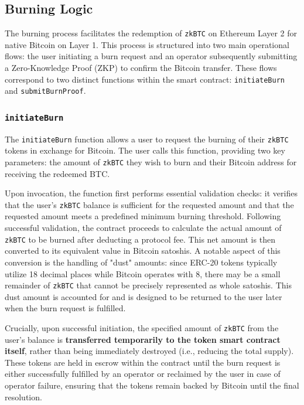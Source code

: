 \documentclass{DESSThesis}
\newcommand{\zktoken}{\texttt{zkBTC}}
\begin{document}
\subsection{Burning Logic} \label{subsec:burning-logic}
The burning process facilitates the redemption of \texttt{\zktoken} on Ethereum Layer 2 for native Bitcoin on Layer 1. This process is structured into two main operational flows: the user initiating a burn request and an operator subsequently submitting a Zero-Knowledge Proof (ZKP) to confirm the Bitcoin transfer. These flows correspond to two distinct functions within the smart contract: \texttt{initiateBurn} and \texttt{submitBurnProof}.

\subsubsection{\texttt{initiateBurn}}
The \texttt{initiateBurn} function allows a user to request the burning of their \texttt{\zktoken} tokens in exchange for Bitcoin. The user calls this function, providing two key parameters: the amount of \texttt{\zktoken} they wish to burn and their Bitcoin address for receiving the redeemed BTC.

Upon invocation, the function first performs essential validation checks: it verifies that the user's \texttt{\zktoken} balance is sufficient for the requested amount and that the requested amount meets a predefined minimum burning threshold. Following successful validation, the contract proceeds to calculate the actual amount of \texttt{\zktoken} to be burned after deducting a protocol fee. This net amount is then converted to its equivalent value in Bitcoin satoshis. A notable aspect of this conversion is the handling of "dust" amounts: since ERC-20 tokens typically utilize 18 decimal places while Bitcoin operates with 8, there may be a small remainder of \texttt{\zktoken} that cannot be precisely represented as whole satoshis. This dust amount is accounted for and is designed to be returned to the user later when the burn request is fulfilled.

Crucially, upon successful initiation, the specified amount of \texttt{\zktoken} from the user's balance is \textbf{transferred temporarily to the token smart contract itself}, rather than being immediately destroyed (i.e., reducing the total supply). These tokens are held in escrow within the contract until the burn request is either successfully fulfilled by an operator or reclaimed by the user in case of operator failure, ensuring that the tokens remain backed by Bitcoin until the final resolution.
\end{document}
